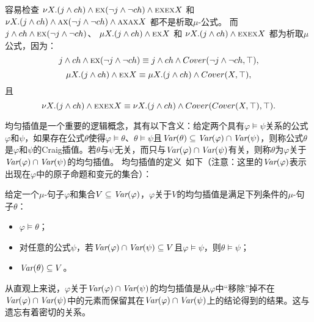 \begin{example}\label{exmp:disF}
	容易检查 $\nu X. (j \wedge ch) \wedge \textsc{e}\textsc{x} (\neg j \wedge \neg ch) \wedge \textsc{e}\textsc{x} \textsc{e}\textsc{x} X$ 和  $\nu X. (j \wedge ch) \wedge \textsc{a}\textsc{x} (\neg j \wedge \neg ch) \wedge \textsc{a}\textsc{x} \textsc{a}\textsc{x} X$ 都不是析取$\mu$-公式。
	而 $j \wedge ch \wedge \textsc{e}\textsc{x} (\neg j \wedge \neg ch)$、 $\mu X. (j \wedge ch) \wedge \textsc{e}\textsc{x} X$ 和 $\nu X. (j \wedge ch) \wedge \textsc{e}\textsc{x} \textsc{e}\textsc{x} X$ 都为析取$\mu$公式，因为：
	\[
	j \wedge ch \wedge \textsc{e}\textsc{x} (\neg j \wedge \neg ch) \equiv j \wedge ch \wedge Cover(\neg j \wedge \neg ch, \top),
	\]
	\[
	\mu X. (j \wedge ch) \wedge \textsc{e}\textsc{x} X \equiv  \mu X. (j \wedge ch) \wedge Cover(X, \top),
	\] 且
	\[
	\nu X. (j \wedge ch) \wedge \textsc{e}\textsc{x} \textsc{e}\textsc{x} X \equiv \nu X. (j \wedge ch) \wedge Cover(Cover(X, \top), \top).
	\]
	
\end{example}

均匀插值是一个重要的逻辑概念，其有以下含义：给定两个具有$\varphi\models\psi$关系的公式$\varphi$和$\psi$，如果存在公式$\theta$使得$\varphi\models \theta$、$\theta \models \psi$且$\textit{Var}(\theta) \subseteq \textit{Var}(\varphi) \cap \textit{Var}(\psi)$，则称公式$\theta$是$\varphi$和$\psi$的Craig插值。若$\theta$与$\psi$无关，而只与$\textit{Var}(\varphi) \cap \textit{Var}(\psi)$有关，则称$\theta$为$\varphi$关于$\textit{Var}(\varphi) \cap \textit{Var}(\psi)$的均匀插值。
均匀插值的定义~\cite{d2006modal}如下（注意：这里的$\textit{Var}(\varphi)$表示出现在$\varphi$中的原子命题和变元的集合）：                                                                                                                                                                                                                                   
\begin{definition}
	给定一个$\mu$-句子$\varphi$和集合$V\subseteq \textit{Var}(\varphi)$，$\varphi$关于$V$的均匀插值是满足下列条件的$\mu$-句子$\theta$：
	\begin{itemize}
		\item $\varphi \models \theta$；
		\item 对任意的公式$\psi$，若$\textit{Var}(\varphi) \cap \textit{Var}(\psi)\subseteq V$且$\varphi \models \psi$，则$\theta \models \psi$；
		\item $\textit{Var}(\theta) \subseteq V$。 
	\end{itemize}
\end{definition}


从直观上来说，$\varphi$关于$\textit{Var}(\varphi) \cap \textit{Var}(\psi)$的均匀插值是从$\varphi$中“移除”掉不在$\textit{Var}(\varphi) \cap \textit{Var}(\psi)$中的元素而保留其在$\textit{Var}(\varphi) \cap \textit{Var}(\psi)$上的结论得到的结果。这与遗忘有着密切的关系。

